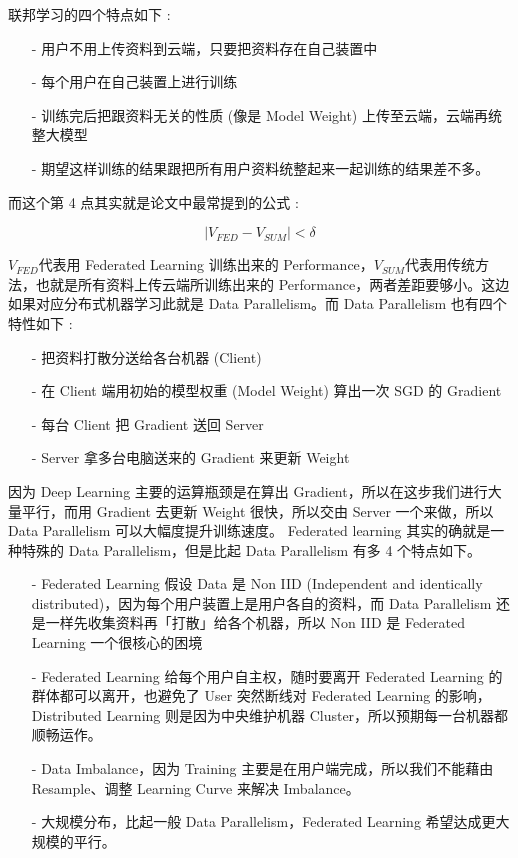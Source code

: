 联邦学习的四个特点如下 :

\begin{itemize}
\item [-] 用户不用上传资料到云端，只要把资料存在自己装置中
\item [-] 每个用户在自己装置上进行训练
\item [-] 训练完后把跟资料无关的性质 (像是 Model Weight) 上传至云端，云端再统整大模型
\item [-] 期望这样训练的结果跟把所有用户资料统整起来一起训练的结果差不多。
\end{itemize}

而这个第 4 点其实就是论文中最常提到的公式 : 

\begin{equation}
\left|V_{F E D}-V_{S U M}\right|<\delta
\end{equation}

$V_{FED}$代表用 Federated Learning 训练出来的 Performance，$V_{SUM}$代表用传统方法，也就是所有资料上传云端所训练出来的 Performance，两者差距要够小。这边如果对应分布式机器学习此就是 Data Parallelism。而 Data Parallelism 也有四个特性如下 : 

\begin{itemize}
\item [-] 把资料打散分送给各台机器 (Client)
\item [-] 在 Client 端用初始的模型权重 (Model Weight) 算出一次 SGD 的 Gradient
\item [-] 每台 Client 把 Gradient 送回 Server
\item [-] Server 拿多台电脑送来的 Gradient 来更新 Weight
\end{itemize}

因为 Deep Learning 主要的运算瓶颈是在算出 Gradient，所以在这步我们进行大量平行，而用 Gradient 去更新 Weight 很快，所以交由 Server 一个来做，所以 Data Parallelism 可以大幅度提升训练速度。 Federated learning 其实的确就是一种特殊的 Data Parallelism，但是比起 Data Parallelism 有多 4 个特点如下。

\begin{itemize}
\item [-] Federated Learning 假设 Data 是 Non IID (Independent and identically distributed)，因为每个用户装置上是用户各自的资料，而 Data Parallelism 还是一样先收集资料再「打散」给各个机器，所以 Non IID 是 Federated Learning 一个很核心的困境
\item [-] Federated Learning 给每个用户自主权，随时要离开 Federated Learning 的群体都可以离开，也避免了 User 突然断线对 Federated Learning 的影响，Distributed Learning 则是因为中央维护机器 Cluster，所以预期每一台机器都顺畅运作。
\item [-] Data Imbalance，因为 Training 主要是在用户端完成，所以我们不能藉由 Resample、调整 Learning Curve 来解决 Imbalance。
\item [-] 大规模分布，比起一般 Data Parallelism，Federated Learning 希望达成更大规模的平行。
\end{itemize}

